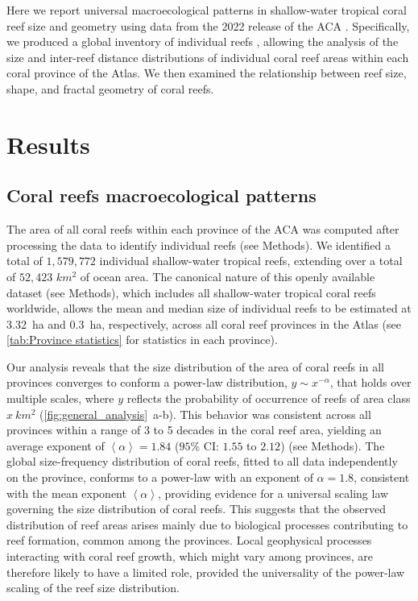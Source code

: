 Here we report universal macroecological patterns
\cite{Brown1995Macroecology} in shallow-water tropical coral reef size and
geometry using data from the 2022 release of the ACA \cite{allen-coral-atlas}.
Specifically, we produced a global inventory of individual reefs
\cite{gimenez_romero_2023_10025083}, allowing the analysis of the size and
inter-reef distance distributions of individual coral reef areas within each
coral province of the Atlas. We then examined the relationship between reef
size, shape, and fractal geometry of coral reefs.

\section{Results}
\subsection{Coral reefs macroecological patterns}

The area of all coral reefs within each province of the ACA was computed
after processing the data to identify individual reefs (see Methods). We
identified a total of $1,579,772$ individual shallow-water tropical reefs,
extending over a total of $52,423$ $km^2$ of ocean area. The canonical nature
of this openly available dataset (see Methods), which includes all
shallow-water tropical coral reefs worldwide, allows the mean and median size
of individual reefs to be estimated at \SI{3.32}{ha} and \SI{0.3}{ha},
respectively, across all coral reef provinces in the Atlas (see
\cref{tab:Province statistics} for statistics in each province).

Our analysis reveals that the size distribution of the area of coral reefs
in all provinces converges to conform a power-law distribution, $y\sim
    x^{-\alpha}$, that holds over multiple scales, where $y$ reflects the
probability of occurrence of reefs of area class $x \ km^2$
(\cref{fig:general_analysis}~\textcolor{ref_color}{a-b}). This behavior was
consistent across all
provinces within a range of 3 to 5 decades in the coral reef area, yielding an
average exponent of $\left<\alpha\right>=1.84$ ($95\%$ CI: $1.55$ to $2.12$)
(see Methods). The global size-frequency distribution of coral reefs, fitted to
all data independently on the province, conforms to a power-law with an
exponent of $\alpha=1.8$, consistent with the mean exponent
$\left<\alpha\right>$, providing evidence for a universal scaling law governing
the size distribution of coral reefs. This suggests that the observed
distribution of reef areas arises mainly due to biological processes
contributing to reef formation, common among the provinces. Local geophysical
processes interacting with coral reef growth, which might vary among provinces,
are therefore likely to have a limited role, provided the universality of the
power-law scaling of the reef size distribution.


